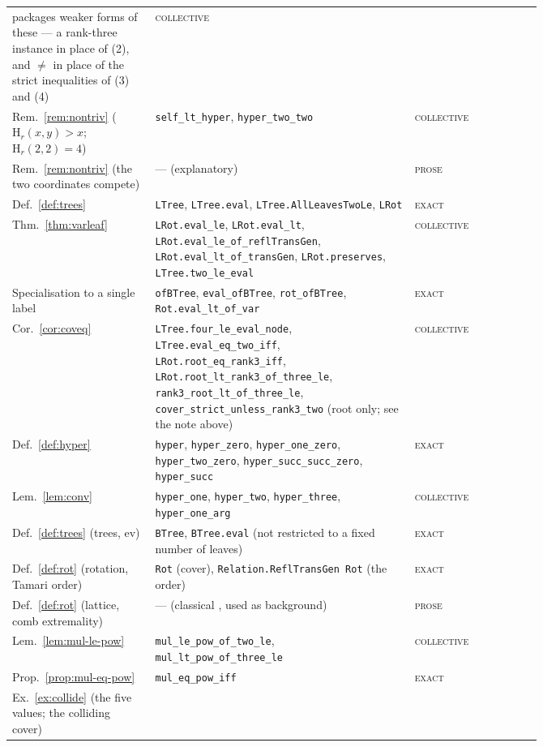 \documentclass[11pt,a4paper]{article}
\theoremstyle{plain}
\theoremstyle{definition}
\newcommand{\HH}{\mathrm{H}}
\newcommand{\ev}{\mathrm{ev}}
\begin{document}
{\begin{longtable}{@{}p{0.27\linewidth}p{0.49\linewidth}l@{}}
  packages weaker forms of these --- a rank-three instance in place of (2), and
  $\ne$ in place of the strict inequalities of (3) and (4) & \textsc{collective}\\
Rem.~\ref{rem:nontriv} ($\HH_r(x,y)>x$; $\HH_r(2,2)=4$) &
  \verb|self_lt_hyper|, \verb|hyper_two_two| & \textsc{collective}\\
Rem.~\ref{rem:nontriv} (the two coordinates compete) & --- (explanatory) &
  \textsc{prose}\\
Def.~\ref{def:trees} & \verb|LTree|, \verb|LTree.eval|,
  \verb|LTree.AllLeavesTwoLe|, \verb|LRot| & \textsc{exact}\\
Thm.~\ref{thm:varleaf} & \verb|LRot.eval_le|, \verb|LRot.eval_lt|,
  \verb|LRot.eval_le_of_reflTransGen|, \verb|LRot.eval_lt_of_transGen|,
  \verb|LRot.preserves|, \verb|LTree.two_le_eval| & \textsc{collective}\\
Specialisation to a single label & \verb|ofBTree|, \verb|eval_ofBTree|,
  \verb|rot_ofBTree|, \verb|Rot.eval_lt_of_var| & \textsc{exact}\\
Cor.~\ref{cor:coveq} & \verb|LTree.four_le_eval_node|,
  \verb|LTree.eval_eq_two_iff|, \verb|LRot.root_eq_rank3_iff|,
  \verb|LRot.root_lt_rank3_of_three_le|, \verb|rank3_root_lt_of_three_le|,
  \verb|cover_strict_unless_rank3_two| (root only; see the note above) &
  \textsc{collective}\\
Def.~\ref{def:hyper} &
  \verb|hyper|, \verb|hyper_zero|, \verb|hyper_one_zero|, \verb|hyper_two_zero|,
  \verb|hyper_succ_succ_zero|, \verb|hyper_succ| & \textsc{exact}\\
Lem.~\ref{lem:conv} &
  \verb|hyper_one|, \verb|hyper_two|, \verb|hyper_three|, \verb|hyper_one_arg| &
  \textsc{collective}\\
Def.~\ref{def:trees} (trees, $\ev$) &
  \verb|BTree|, \verb|BTree.eval| (not restricted to a fixed number of leaves) &
  \textsc{exact}\\
Def.~\ref{def:rot} (rotation, Tamari order) &
  \verb|Rot| (cover), \verb|Relation.ReflTransGen Rot| (the order) &
  \textsc{exact}\\
Def.~\ref{def:rot} (lattice, comb extremality) &
  --- (classical \cite{FT}, used as background) & \textsc{prose}\\
Lem.~\ref{lem:mul-le-pow} &
  \verb|mul_le_pow_of_two_le|, \verb|mul_lt_pow_of_three_le| & \textsc{collective}\\
Prop.~\ref{prop:mul-eq-pow} & \verb|mul_eq_pow_iff| & \textsc{exact}\\
Ex.~\ref{ex:collide} (the five values; the colliding cover) &

\end{longtable}}
\end{document}
